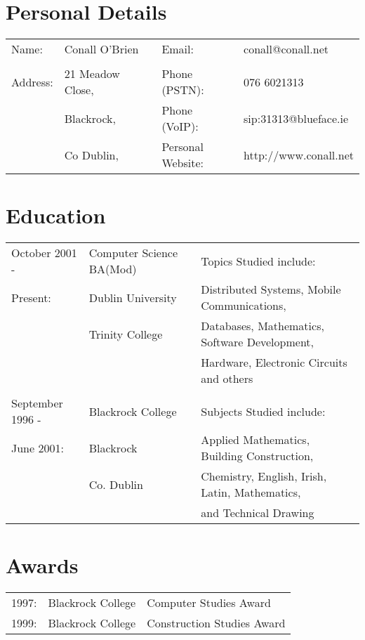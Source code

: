 \documentclass[a4paper, 11pt] {article}
\begin{document}
\section*{Personal Details}

\begin{tabular}{l l l l l}
Name: 	& Conall O'Brien		&	&	Email: 				& conall@conall.net 	  	\\	
			&							&	&							&								\\
Address:	& 21 Meadow Close, 	&	&	Phone (PSTN):		& 076 6021313				\\
			& Blackrock,			&	&	Phone (VoIP):		& sip:31313@blueface.ie	\\
			& Co Dublin, 		 	&  &	Personal Website:	& http://www.conall.net	\\
\end{tabular}

\section*{Education}

\begin{tabular}{l l l l}
October 2001 - 		& Computer Science BA(Mod)	&	&	Topics Studied include:				\\
Present:					& 	Dublin University 		&	&	Distributed Systems, Mobile Communications,\\
							& 	Trinity College 			&	& 	Databases, Mathematics, Software Development,\\
						 	&									&	&	Hardware, Electronic Circuits and others	\\	
							&									&	&	\\
September 1996 - 		& Blackrock College			&	&	Subjects Studied include:\\
June 2001:				& Blackrock						&	&	Applied Mathematics, Building Construction, \\ 
							& Co. Dublin 					&	&	Chemistry, English, Irish, Latin, Mathematics, \\
							&									&	&	and Technical Drawing \\
\end{tabular}

\section*{Awards}

\begin{tabular}{l l l}
1997:	& Blackrock College	 & 	Computer Studies Award 		\\
1999:	& Blackrock College 	 & 	Construction Studies Award	\\
\end{tabular}
\end{document}
